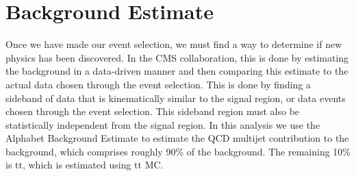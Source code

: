 \chapter{Background Estimate}\label{Sec:Bkg}

Once we have made our event selection, we must find a way to determine if new physics has been discovered. In the CMS collaboration, this is done by estimating the background in a data-driven manner and then comparing this estimate to the actual data chosen through the event selection. This is done by finding a sideband of data that is kinematically similar to the signal region, or data events chosen through the event selection. This sideband region must also be statistically independent from the signal region. In this analysis we use the Alphabet Background Estimate to estimate the QCD multijet contribution to the background, which comprises roughly 90\% of the background. The remaining 10\% is tt, which is estimated using tt MC.

